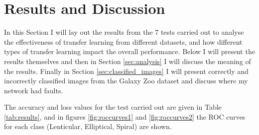 \documentclass[12pt, onecolumn]{aa}
\begin{document}
\newpage

\section{Results and Discussion}\label{sec:results}
In this Section I will lay out the results from the 7 tests carried out to analyse the effectiveness of transfer learning from different datasets, and how different types of transfer learning impact the overall performance. Below I will present the results themselves and then in Section \ref{sec:analysis} I will discuss the meaning of the results. Finally in Section \ref{sec:classified_images} I will present correctly and incorrectly classified images from the Galaxy Zoo dataset and discuss where my network had faults.


The accuracy and loss values for the test carried out are given in Table \ref{tab:results}, and in figures \ref{fig:roccurves1} and \ref{fig:roccurves2} the ROC curves for each class (Lenticular, Elliptical, Spiral) are shown. 
\end{document}

